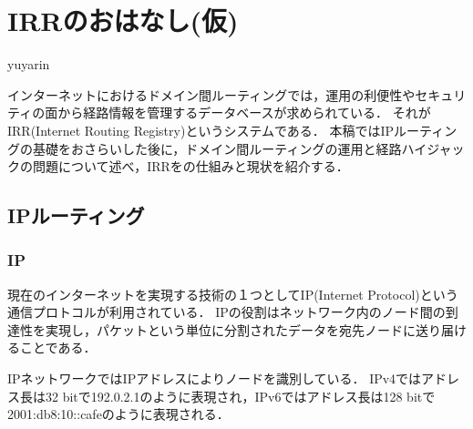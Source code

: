 
\chapter{IRRのおはなし(仮)}

\begin{flushright}
 {\headfont yuyarin} %
\end{flushright}



インターネットにおけるドメイン間ルーティングでは，運用の利便性やセキュリティの面から経路情報を管理するデータベースが求められている．
それがIRR(Internet Routing Registry)というシステムである．
本稿ではIPルーティングの基礎をおさらいした後に，ドメイン間ルーティングの運用と経路ハイジャックの問題について述べ，IRRをの仕組みと現状を紹介する．

%

\section{IPルーティング}

\subsection{IP}

現在のインターネットを実現する技術の１つとしてIP(Internet Protocol)という通信プロトコルが利用されている．
IPの役割はネットワーク内のノード間の到達性を実現し，パケットという単位に分割されたデータを宛先ノードに送り届けることである．

IPネットワークではIPアドレスによりノードを識別している．
IPv4ではアドレス長は32 bitで192.0.2.1のように表現され，IPv6ではアドレス長は128 bitで2001:db8:10::cafeのように表現される．

